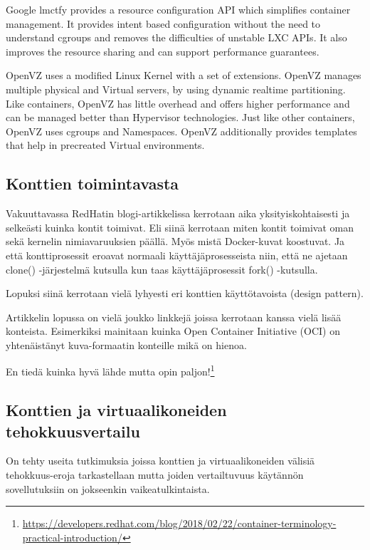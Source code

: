 \documentclass[finnish]{tktltiki2}
\theoremstyle{definition}
\theoremstyle{remark}
\begin{document}
Google lmctfy provides a resource configuration API which simplifies container management. It provides intent based configuration without the need to understand cgroups and removes the difficulties of unstable LXC APIs. It also improves the resource sharing and can support performance guarantees.

OpenVZ uses a modified Linux Kernel with a set of extensions. OpenVZ manages multiple physical and Virtual
servers, by using dynamic realtime partitioning. Like containers, OpenVZ has little overhead and offers higher performance and can be managed better than Hypervisor technologies. Just like other containers, OpenVZ uses cgroups and Namespaces. OpenVZ additionally provides templates that help in precreated Virtual environments.

\cite{virtualization-vs-containerization}

\subsection{Konttien toimintavasta}

Vakuuttavassa RedHatin blogi-artikkelissa kerrotaan aika yksityiskohtaisesti ja selkeästi kuinka kontit toimivat. 
Eli siinä kerrotaan miten kontit toimivat oman sekä kernelin nimiavaruuksien päällä. Myös mistä Docker-kuvat koostuvat. Ja että konttiprosessit eroavat normaali käyttäjäprosesseista niin, että ne ajetaan clone() -järjestelmä kutsulla kun taas käyttäjäprosessit fork() -kutsulla.

Lopuksi siinä kerrotaan vielä lyhyesti eri konttien käyttötavoista (design pattern).

Artikkelin lopussa on vielä joukko linkkejä joissa kerrotaan kanssa vielä lisää konteista. Esimerkiksi mainitaan kuinka Open Container Initiative (OCI) on yhtenäistänyt kuva-formaatin konteille mikä on hienoa.

En tiedä kuinka hyvä lähde mutta opin paljon!\footnote{\url{https://developers.redhat.com/blog/2018/02/22/container-terminology-practical-introduction/}}

\subsection{Konttien ja virtuaalikoneiden tehokkuusvertailu}

On tehty useita tutkimuksia joissa konttien ja virtuaalikoneiden välisiä tehokkuus-eroja tarkastellaan mutta joiden vertailtuvuus käytännön sovellutuksiin on jokseenkin vaikeatulkintaista. 
\end{document}
